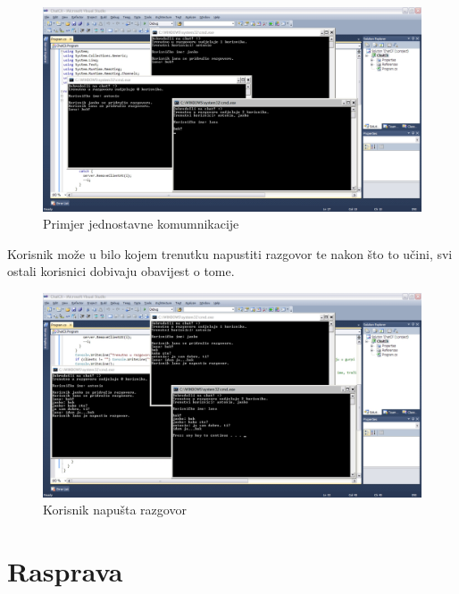 \documentclass[10pt,a4paper,onecolumn,titlepage]{article}
\begin{document}
\begin{figure}[!ht]
\begin{minipage}{\textwidth}
\centering
\includegraphics[width=\textwidth]{images/comunication.jpg}
\caption{Primjer jednostavne komumnikacije}
\end{minipage}
\end{figure}

Korisnik može u bilo kojem trenutku napustiti razgovor te nakon što to učini, svi ostali korisnici dobivaju obavijest o tome.

\newpage

\begin{figure}[!ht]
\begin{minipage}{\textwidth}
\centering
\includegraphics[width=\textwidth]{images/leaving_notification.jpg}
\caption{Korisnik napušta razgovor}
\end{minipage}
\end{figure}

\section{Rasprava}
\end{document}
